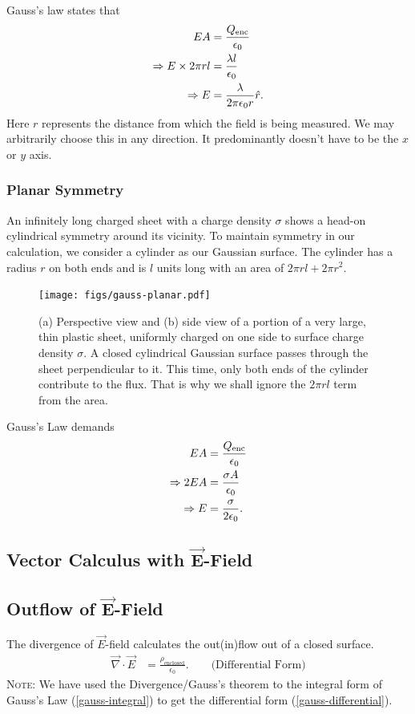 \documentclass[12pt,b4paper]{article}
\begin{document}
Gauss's law states that
\begin{align}
    EA&=\frac{Q_\text{enc}}{\epsilon_0}\notag\\
    \Rightarrow E\times2\pi rl &=\frac{\lambda l}{\epsilon_0}\notag\\
    \Rightarrow E&=\frac{\lambda}{2\pi\epsilon_0 r}\hat{r}.
\end{align}
Here $r$ represents the distance from which the field is being measured. We may arbitrarily choose this in any direction. It predominantly doesn't have to be the $x$ or $y$ axis.
\subsubsection*{Planar Symmetry}
An infinitely long charged sheet with a charge density $\sigma$ shows a head-on cylindrical symmetry around its vicinity. To maintain symmetry in our calculation, we consider a cylinder as our Gaussian surface. The cylinder has a radius $r$ on both ends and is $l$ units long with an area of $2\pi rl + 2\pi r^2$.
\begin{figure}[H]
    \centering
    \texttt{[image: figs/gauss-planar.pdf]}
    \caption{(a) Perspective view and (b) side view of a portion of a very large, thin plastic sheet, uniformly charged on one side to surface charge density $\sigma$. A closed cylindrical Gaussian surface passes through the sheet perpendicular to it. This time, only both ends of the cylinder contribute to the flux. That is why we shall ignore the $2\pi rl$ term from the area.}
    \label{fig:gauss-law-planar}
\end{figure}
Gauss's Law demands
\begin{align}
    EA&=\frac{Q_\text{enc}}{\epsilon_0}\notag\\
    \Rightarrow 2EA &=\frac{\sigma A}{\epsilon_0}\notag\\
    \Rightarrow E&=\frac{\sigma}{2\epsilon_0}.
\end{align}
\subsection{Vector Calculus with $\boldsymbol{\vec{E}}$-Field}
\subsection*{Outflow of $\boldsymbol{\vec{E}}$-Field}
The divergence of $\vec{E}$-field calculates the out(in)flow out of a closed surface.
\begin{align}
    \vec{\nabla}\cdot\vec{E} &= \frac{\rho_\text{enclosed}}{\epsilon_0}.\qquad\text{(Differential Form)}\label{gauss-differential}
\end{align}
\textsc{Note}: We have used the Divergence/Gauss's theorem to the integral form of Gauss's Law (\ref{gauss-integral}) to get the differential form (\ref{gauss-differential}).
\end{document}
